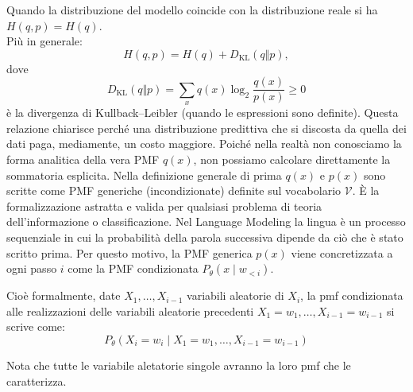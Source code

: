 Quando la distribuzione del  modello coincide con la distribuzione reale si ha $H(q,p)=H(q)$. \\ 
Più in generale:
\begin{equation}
H(q,p)=H(q)+D_{\mathrm{KL}}(q\Vert p),
\end{equation}
dove
\begin{equation}
D_{\mathrm{KL}}(q\Vert p)=\sum_xq(x)\log_2\frac{q(x)}{p(x)}\geq0
\end{equation}
è la divergenza di Kullback--Leibler (quando le espressioni sono definite). Questa relazione chiarisce perché una distribuzione predittiva che si discosta da quella dei dati paga, mediamente, un costo maggiore.
\newpage
Poiché nella realtà non conosciamo la forma analitica della vera PMF $q(x)$, non possiamo calcolare direttamente la sommatoria esplicita.
Nella definizione generale di prima $q(x)$ e $p(x)$ sono scritte come PMF generiche (incondizionate) definite sul vocabolario $\mathcal{V}$. È la formalizzazione astratta e valida per qualsiasi problema di teoria dell'informazione o classificazione.
Nel Language Modeling la lingua è un processo sequenziale in cui la probabilità della parola successiva dipende da ciò che è stato scritto prima. Per questo motivo, la PMF generica $p(x)$ viene concretizzata a ogni passo $i$ come la PMF condizionata $P_\theta(x \mid w_{<i})$. 


Cioè formalmente, date $X_1,\dots,X_{i-1}$ variabili aleatorie di $X_i$, la pmf condizionata alle realizzazioni delle variabili aleatorie precedenti $X_1 = w_1, \dots, X_{i-1} = w_{i-1}$ si scrive come:
$$P_\theta(X_i = w_i \mid X_1 = w_1, \dots, X_{i-1} = w_{i-1})$$
\begin{observation}{}
    Nota che tutte le variabile aletatorie singole avranno la loro pmf che le caratterizza.
\end{observation}

